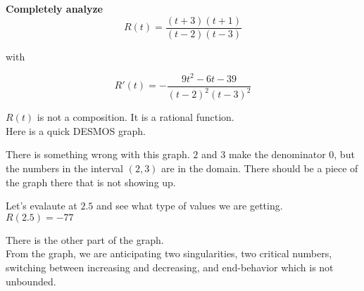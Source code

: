\documentclass{ximera}
\begin{document}
\begin{example}

\textbf{\textcolor{purple!85!blue}{Completely analyze}} \\


\[   R(t) = \frac{(t+3)(t+1)}{(t-2)(t-3)} \]

with 

\[   R'(t) = -\frac{9 t^2 -6 t -39}{(t-2)^2 (t-3)^2} \]



$R(t)$ is not a composition. It is a rational function. \\


Here is a quick DESMOS graph.


\begin{center}
\end{center}


There is something wrong with this graph.  $2$ and $3$ make the denominator $0$, but the numbers in the interval $(2, 3)$ are in the domain.  There should be a piece of the graph there that is not showing up.


Let's evalaute at $2.5$ and see what type of values we are getting. \\

$R(2.5) = -77$


\begin{center}
\end{center}


There is the other part of the graph. \\



From the graph, we are anticipating two singularities, two critical numbers, switching between increasing and decreasing, and end-behavior which is not unbounded. \\








































\end{example}
\end{document}
